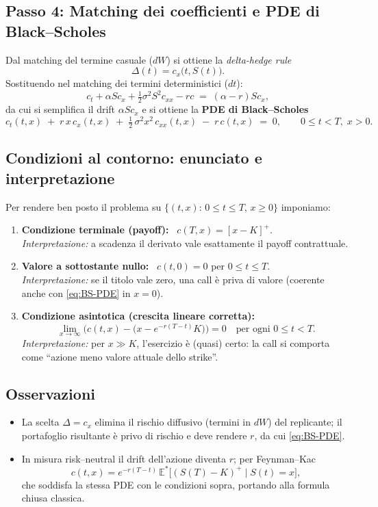\documentclass[12pt,a4paper]{book}
\theoremstyle{remark}
\begin{document}
\subsection*{Passo 4: Matching dei coefficienti e PDE di Black--Scholes}
Dal matching del termine casuale ($dW$) si ottiene la \emph{delta-hedge rule}
\[
\Delta(t)=c_x\big(t,S(t)\big).
\]
Sostituendo nel matching dei termini deterministici ($dt$):
\[
c_t + \alpha S c_x + \tfrac12 \sigma^2 S^2 c_{xx} - r c \;=\; (\alpha - r) S c_x,
\]
da cui si semplifica il drift $\alpha S c_x$ e si ottiene la \textbf{PDE di Black--Scholes}
\begin{equation}
\label{eq:BS-PDE}
c_t(t,x) \;+\; r\,x\,c_x(t,x) \;+\; \tfrac12\,\sigma^2 x^2\,c_{xx}(t,x) \;-\; r\,c(t,x) \;=\; 0,
\qquad 0\le t<T,\; x>0.
\end{equation}

\subsection{Condizioni al contorno: enunciato e interpretazione}
Per rendere ben posto il problema su $\{(t,x):\,0\le t\le T,\,x\ge 0\}$ imponiamo:
\begin{enumerate}
  \item \textbf{Condizione terminale (payoff):} \ $c(T,x)=[x-K]^+$. \\
  \emph{Interpretazione:} a scadenza il derivato vale esattamente il payoff contrattuale.
  \item \textbf{Valore a sottostante nullo:} \ $c(t,0)=0$ per $0\le t\le T$. \\
  \emph{Interpretazione:} se il titolo vale zero, una call è priva di valore (coerente anche con \eqref{eq:BS-PDE} in $x=0$).
  \item \textbf{Condizione asintotica (crescita lineare corretta):}
  \[
  \lim_{x\to\infty}\Big(c(t,x)-\big(x-e^{-r(T-t)}K\big)\Big)=0 \quad \text{per ogni } 0\le t<T.
  \]
  \emph{Interpretazione:} per $x\gg K$, l'esercizio è (quasi) certo: la call si comporta come ``azione meno valore attuale dello strike''.
\end{enumerate}

\subsection*{Osservazioni}
\begin{itemize}
  \item La scelta $\Delta=c_x$ elimina il rischio diffusivo (termini in $dW$) del replicante; il portafoglio risultante è privo di rischio e deve rendere $r$, da cui \eqref{eq:BS-PDE}.
  \item In misura risk--neutral il drift dell'azione diventa $r$; per Feynman--Kac
  \[
  c(t,x)=e^{-r(T-t)}\,\mathbb{E}^{\!*}\!\big[(S(T)-K)^+\mid S(t)=x\big],
  \]
  che soddisfa la stessa PDE con le condizioni sopra, portando alla formula chiusa classica.
\end{itemize}
\end{document}

